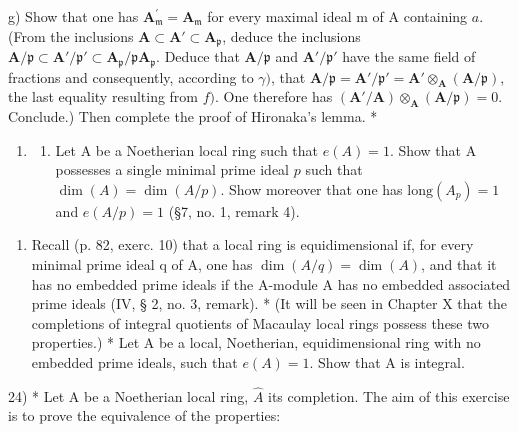 g) Show that one has \(\mathbf{A}_{\mathfrak{m}}^{\prime} = \mathbf{A}_{\mathfrak{m}}\) for every maximal ideal m of A containing \(a\). (From the inclusions \(\mathbf{A} \subset \mathbf{A}' \subset \mathbf{A}_{\mathfrak{p}}\), deduce the inclusions \(\mathbf{A}/\mathfrak{p} \subset \mathbf{A}'/\mathfrak{p}' \subset \mathbf{A}_{\mathfrak{p}}/\mathfrak{p}\mathbf{A}_{\mathfrak{p}}\). Deduce that \(\mathbf{A}/\mathfrak{p}\) and \(\mathbf{A}'/\mathfrak{p}'\) have the same field of fractions and consequently, according to \(\gamma)\), that \(\mathbf{A}/\mathfrak{p} = \mathbf{A}'/\mathfrak{p}' = \mathbf{A}' \otimes_{\mathbf{A}} (\mathbf{A}/\mathfrak{p})\), the last equality resulting from \(f)\). One therefore has \((\mathbf{A}'/\mathbf{A}) \otimes_{\mathbf{A}} (\mathbf{A}/\mathfrak{p}) = 0\). Conclude.) Then complete the proof of Hironaka's lemma. *

\begin{enumerate}
\def\labelenumi{\arabic{enumi})}
\setcounter{enumi}{22}
\tightlist
\item
  \begin{enumerate}
  \def\labelenumii{\alph{enumii})}
  \tightlist
  \item
    Let A be a Noetherian local ring such that \(e(A) = 1\). Show that A possesses a single minimal prime ideal \(p\) such that \(\dim(A) = \dim(A/p)\). Show moreover that one has \(\text{long}(A_p) = 1\) and \(e(A/p) = 1\) (\S 7, no. 1, remark 4).
  \end{enumerate}
\end{enumerate}

\begin{enumerate}
\def\labelenumi{\alph{enumi})}
\setcounter{enumi}{1}
\tightlist
\item
  Recall (p. 82, exerc. 10) that a local ring is equidimensional if, for every minimal prime ideal q of A, one has \(\dim(A/q) = \dim(A)\), and that it has no embedded prime ideals if the A-module A has no embedded associated prime ideals (IV, § 2, no. 3, remark). * (It will be seen in Chapter X that the completions of integral quotients of Macaulay local rings possess these two properties.) * Let A be a local, Noetherian, equidimensional ring with no embedded prime ideals, such that \(e(A) = 1\). Show that A is integral.
\end{enumerate}

24) * Let A be a Noetherian local ring, \(\widehat{A}\) its completion. The aim of this exercise is to prove the equivalence of the properties:


